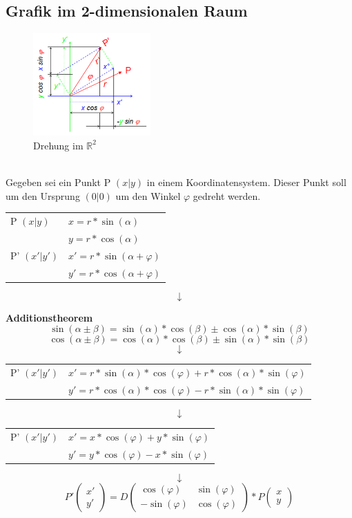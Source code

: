 \documentclass{school}
\begin{document}
\newpage
\subsection{Grafik im 2-dimensionalen Raum}
\begin{figure}[hh]
    \centering
    \includegraphics[width=0.4\textwidth]{drehung.png}
    \caption[http://systemdesign.ch/wiki/Drehung]{Drehung im $\mathbb{R}^2$}
    \label{fig:drehung}
\end{figure}~\\
Gegeben sei ein Punkt P $(x|y)$ in einem Koordinatensystem. Dieser Punkt soll um den Ursprung $(0|0)$ um den Winkel $\varphi$ gedreht werden.
\begin{center}
    \begin{tabular}{l l}
        P $(x|y)$ & $x = r * \sin(\alpha)$\\
        & $y = r * \cos(\alpha)$\\
        P' $(x'|y')$ & $x' = r * \sin(\alpha + \varphi)$\\
        & $y' = r * \cos(\alpha + \varphi)$
    \end{tabular}

    $$\downarrow$$

    \textbf{Additionstheorem}
    $$\sin(\alpha \pm \beta) = \sin(\alpha) * \cos(\beta) \pm \cos(\alpha) * \sin(\beta)$$
    $$\cos(\alpha \pm \beta) = \cos(\alpha) * \cos(\beta) \pm \sin(\alpha) * \sin(\beta)$$
    $$\downarrow$$
    \begin{tabular}{l l}
        P' $(x'|y')$ & $x' = r * \sin(\alpha) * \cos(\varphi) + r * \cos(\alpha) * \sin(\varphi)$\\
        & $y' = r * \cos(\alpha) * \cos(\varphi) - r * \sin(\alpha) * \sin(\varphi)$
    \end{tabular}
    $$\downarrow$$
    \begin{tabular}{l l}
        P' $(x'|y')$ & $x' = x * \cos(\varphi) + y * \sin(\varphi)$\\
        & $y' = y * \cos(\varphi) - x * \sin(\varphi)$
    \end{tabular}
    $$\downarrow$$
    $$P' \begin{pmatrix}x'\\y'\end{pmatrix} =
    D \begin{pmatrix}
        \cos(\varphi) & \sin(\varphi)\\
        -\sin(\varphi) & \cos(\varphi)
    \end{pmatrix} *
    P \begin{pmatrix}x\\y\end{pmatrix}
    $$
\end{center}
\end{document}
